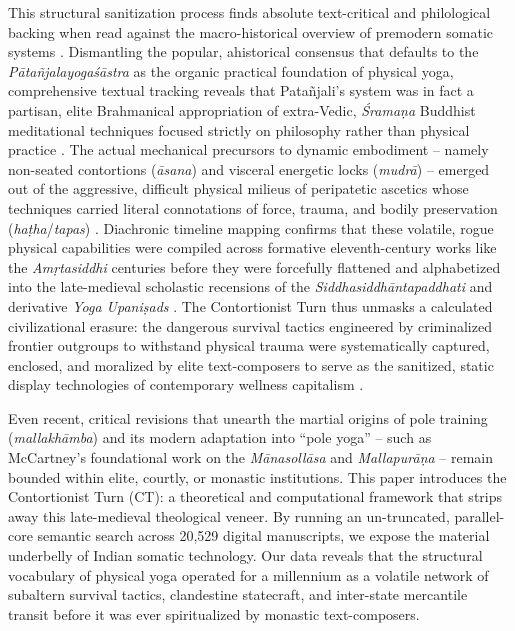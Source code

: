 \documentclass[11pt,twoside,letterpaper]{article}
\begin{document}
This structural sanitization process finds absolute text-critical and philological backing when read against the macro-historical overview of premodern somatic systems \cite{Mallinson2017}. Dismantling the popular, ahistorical consensus that defaults to the \textit{Pātañjalayogaśāstra} as the organic practical foundation of physical yoga, comprehensive textual tracking reveals that Patañjali's system was in fact a partisan, elite Brahmanical appropriation of extra-Vedic, \textit{Śramaṇa} Buddhist meditational techniques focused strictly on philosophy rather than physical practice \cite{Mallinson2017}. The actual mechanical precursors to dynamic embodiment -- namely non-seated contortions (\textit{āsana}) and visceral energetic locks (\textit{mudrā}) -- emerged out of the aggressive, difficult physical milieus of peripatetic ascetics whose techniques carried literal connotations of force, trauma, and bodily preservation (\textit{haṭha}/\textit{tapas}) \cite{Mallinson2017}. Diachronic timeline mapping confirms that these volatile, rogue physical capabilities were compiled across formative eleventh-century works like the \textit{Amṛtasiddhi} centuries before they were forcefully flattened and alphabetized into the late-medieval scholastic recensions of the \textit{Siddhasiddhāntapaddhati} and derivative \textit{Yoga Upaniṣads} \cite{Birch2024, Mallinson2017}. The Contortionist Turn thus unmasks a calculated civilizational erasure: the dangerous survival tactics engineered by criminalized frontier outgroups to withstand physical trauma were systematically captured, enclosed, and moralized by elite text-composers to serve as the sanitized, static display technologies of contemporary wellness capitalism \cite{Debnath2024, Mallinson2017, McCartney2021}.

Even recent, critical revisions that unearth the martial origins of pole training (\textit{mallakhāmba}) and its modern adaptation into ``pole yoga'' -- such as McCartney’s foundational work on the \textit{Mānasollāsa} and \textit{Mallapurāṇa} -- remain bounded within elite, courtly, or monastic institutions. This paper introduces the Contortionist Turn (CT): a theoretical and computational framework that strips away this late-medieval theological veneer. By running an un-truncated, parallel-core semantic search across 20,529 digital manuscripts, we expose the material underbelly of Indian somatic technology. Our data reveals that the structural vocabulary of physical yoga operated for a millennium as a volatile network of subaltern survival tactics, clandestine statecraft, and inter-state mercantile transit before it was ever spiritualized by monastic text-composers. 
 
\end{document}
